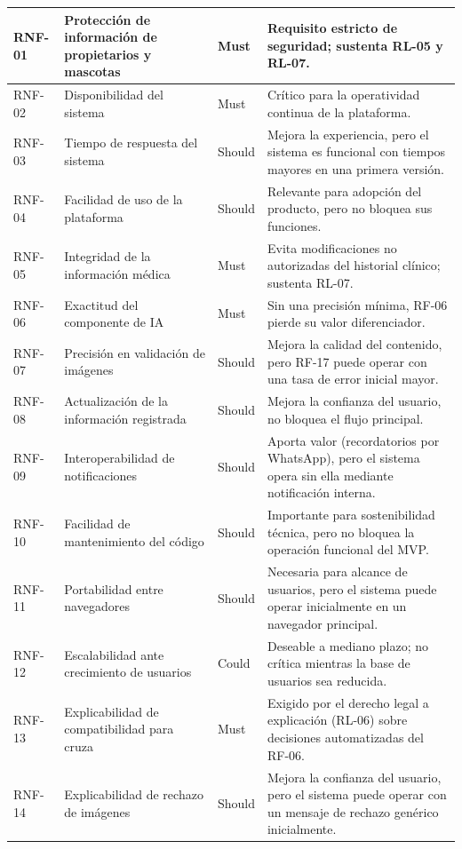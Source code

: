 \documentclass[journal,onecolumn]{IEEEtran}
\begin{document}
\begin{longtable}{@{}p{1.6cm} p{4.8cm} p{1.6cm} p{5.2cm}@{}}
		\hline
		RNF-01 & Protección de información de propietarios y mascotas & Must & Requisito estricto de seguridad; sustenta RL-05 y RL-07. \\
		\hline
		RNF-02 & Disponibilidad del sistema & Must & Crítico para la operatividad continua de la plataforma. \\
		\hline
		RNF-03 & Tiempo de respuesta del sistema & Should & Mejora la experiencia, pero el sistema es funcional con tiempos mayores en una primera versión. \\
		\hline
		RNF-04 & Facilidad de uso de la plataforma & Should & Relevante para adopción del producto, pero no bloquea sus funciones. \\
		\hline
		RNF-05 & Integridad de la información médica & Must & Evita modificaciones no autorizadas del historial clínico; sustenta RL-07. \\
		\hline
		RNF-06 & Exactitud del componente de IA & Must & Sin una precisión mínima, RF-06 pierde su valor diferenciador. \\
		\hline
		RNF-07 & Precisión en validación de imágenes & Should & Mejora la calidad del contenido, pero RF-17 puede operar con una tasa de error inicial mayor. \\
		\hline
		RNF-08 & Actualización de la información registrada & Should & Mejora la confianza del usuario, no bloquea el flujo principal. \\
		\hline
		RNF-09 & Interoperabilidad de notificaciones & Should & Aporta valor (recordatorios por WhatsApp), pero el sistema opera sin ella mediante notificación interna. \\
		\hline
		RNF-10 & Facilidad de mantenimiento del código & Should & Importante para sostenibilidad técnica, pero no bloquea la operación funcional del MVP. \\
		\hline
		RNF-11 & Portabilidad entre navegadores & Should & Necesaria para alcance de usuarios, pero el sistema puede operar inicialmente en un navegador principal. \\
		\hline
		RNF-12 & Escalabilidad ante crecimiento de usuarios & Could & Deseable a mediano plazo; no crítica mientras la base de usuarios sea reducida. \\
		\hline
		RNF-13 & Explicabilidad de compatibilidad para cruza & Must & Exigido por el derecho legal a explicación (RL-06) sobre decisiones automatizadas del RF-06. \\
		\hline
		RNF-14 & Explicabilidad de rechazo de imágenes & Should & Mejora la confianza del usuario, pero el sistema puede operar con un mensaje de rechazo genérico inicialmente. \\

\end{longtable}
\end{document}
